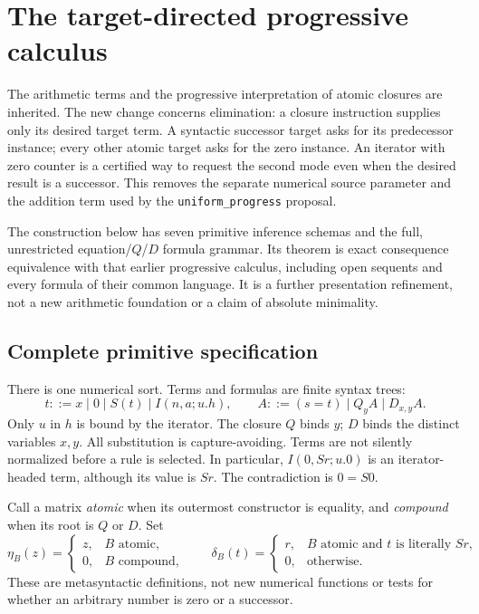 \section{The target-directed progressive calculus}
\label{target:section}

The arithmetic terms and the progressive interpretation of atomic closures
are inherited.  The new change concerns elimination: a closure instruction
supplies only its desired target term.  A syntactic successor target asks for
its predecessor instance; every other atomic target asks for the zero
instance.  An iterator with zero counter is a certified way to request the
second mode even when the desired result is a successor.  This removes the
separate numerical source parameter and the addition term used by the
\texttt{uniform\_progress} proposal.

The construction below has seven primitive inference schemas and the full,
unrestricted equation/$Q$/$D$ formula grammar.  Its theorem is exact
consequence equivalence with that earlier progressive calculus, including
open sequents and every formula of their common language.  It is a further
presentation refinement, not a new arithmetic foundation or a claim of
absolute minimality.

\subsection{Complete primitive specification}
\label{target:specification}

There is one numerical sort.  Terms and formulas are finite syntax trees:
\[
 t ::= x\mid 0\mid S(t)\mid I(n,a;u.h),
 \qquad
 A ::= (s=t)\mid Q_y A\mid D_{x,y}A.
\]
Only $u$ in $h$ is bound by the iterator.  The closure $Q$ binds $y$; $D$
binds the distinct variables $x,y$.  All substitution is capture-avoiding.
Terms are not silently normalized before a rule is selected.  In particular,
$I(0,Sr;u.0)$ is an iterator-headed term, although its value is $Sr$.
The contradiction is $0=S0$.

Call a matrix \emph{atomic} when its outermost constructor is equality,
and \emph{compound} when its root is $Q$ or $D$.  Set
\[
 \eta_B(z)=
 \begin{cases}
 z,&B\text{ atomic},\\
 0,&B\text{ compound},
 \end{cases}
 \qquad
 \delta_B(t)=
 \begin{cases}
 r,&B\text{ atomic and }t\text{ is literally }Sr,\\
 0,&\text{otherwise}.
 \end{cases}
 \tag{Target dispatch}\label{target:dispatch}
\]
These are metasyntactic definitions, not new numerical functions or tests
for whether an arbitrary number is zero or a successor.

